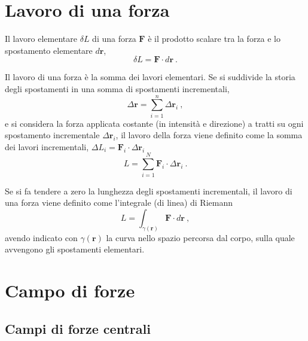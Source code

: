 \section{Lavoro di una forza}
\begin{definition} Il lavoro elementare $\delta L$ di una forza $\mathbf{F}$ è il prodotto scalare tra la forza e lo spostamento elementare $d \mathbf{r}$,
    \begin{equation}
        \delta L = \mathbf{F} \cdot d \mathbf{r} \ .
    \end{equation}
\end{definition}
Il lavoro di una forza è la somma dei lavori elementari. Se si suddivide la storia degli spostamenti in una somma di spostamenti incrementali,
\begin{equation}
  \Delta \mathbf{r} = \sum_{i=1}^{n} \Delta \mathbf{r}_i \ ,
\end{equation}
e si considera la forza applicata costante (in intensità e direzione) a tratti su ogni spostamento incrementale $\Delta \mathbf{r}_i$, il lavoro della forza viene definito come la somma dei lavori incrementali, $\Delta L_i = \mathbf{F}_i \cdot \Delta \mathbf{r}_i$
\begin{equation}
  L = \sum_{i=1}^{N} \mathbf{F}_i \cdot \Delta \mathbf{r}_i \ .
\end{equation}
\begin{definition}
Se si fa tendere a zero la lunghezza degli spostamenti incrementali, il lavoro di una forza viene definito come l'integrale (di linea) di Riemann
\begin{equation}
    L = \int_{\gamma(\mathbf{r})} \mathbf{F} \cdot d \mathbf{r} \ ,
\end{equation}
avendo indicato con $\gamma(\mathbf{r})$ la curva nello spazio percorsa dal corpo, sulla quale avvengono gli spostamenti elementari.
\end{definition}

\section{Campo di forze}
\begin{definition}
\end{definition}

\subsection{Campi di forze centrali}
